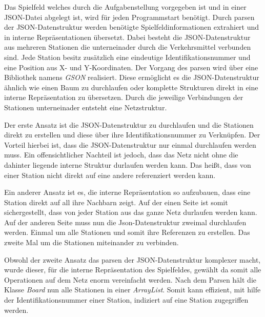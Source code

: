                 Das Spielfeld welches durch die Aufgabenstellung vorgegeben ist und in einer JSON-Datei abgelegt ist,
                wird für jeden Programmstart benötigt. Durch parsen der JSON-Datenstruktur werden benötigte Spielfeldinformationen
                extrahiert und in interne Repräsentationen übersetzt.
                Dabei besteht die JSON-Datenstruktur aus mehreren Stationen die unterneinader durch die Verkehrsmittel verbunden sind.
                Jede Station besitz zusätzlich eine eindeutige Identifikationsnummer und eine Position aus X- und Y-Koordinaten.
                \newline
                Der Vorgang des parsen wird über eine Bibliothek namens \textit{GSON} realisiert.
                Diese ermöglicht es die JSON-Datenstruktur ähnlich wie einen Baum zu durchlaufen
                oder komplette Strukturen direkt in eine interne Repräsentation zu übersetzen.
                \newline
                \newline
                Durch die jeweilige Verbindungen der Stationen unterneinader entsteht eine Netzstruktur.

                Der erste Ansatz ist die JSON-Datenstruktur zu durchlaufen und
                die Stationen direkt zu erstellen und diese über ihre Identifikationsnummer zu Verknüpfen.
                Der Vorteil hierbei ist, dass die JSON-Datenstruktur nur einmal durchlaufen werden muss.
                Ein offensichtlicher Nachteil ist jedoch, dass das Netz nicht ohne die dahinter liegende
                interne Struktur durlaufen werden kann.
                Das heißt, dass von einer Station nicht direkt auf eine andere referenziert werden kann.

                Ein anderer Ansatz ist es, die interne Repräsentation so aufzubauen,
                dass eine Station direkt auf all ihre Nachbarn zeigt.
                Auf der einen Seite ist somit sichergestellt, dass von jeder Station aus das ganze Netz durlaufen werden kann.
                Auf der anderen Seite muss nun die Json-Datenstruktur zweimal durchlaufen werden.
                Einmal um alle Stationen und somit ihre Referenzen zu erstellen.
                Das zweite Mal um die Stationen miteinander zu verbinden.

                Obwohl der zweite Ansatz das parsen der JSON-Datenstruktur komplexer macht, 
                wurde dieser, für die interne Repräsentation des Spielfeldes,
                gewählt da somit alle Operationen auf dem Netz enorm vereinfacht werden.
                \newline
                \newline
                Nach dem Parsen hält die Klasse \textit{Board} nun alle Stationen in einer \textit{ArrayList}.
                Somit kann effizient, mit hilfe der Identifikationsnummer einer Station, indiziert auf eine Station zugegriffen werden.

